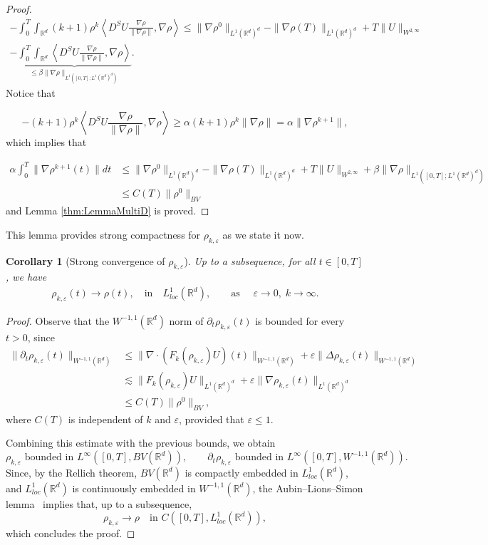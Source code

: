 \documentclass[11pt,twoside]{article}
\numberwithin{equation}{section}
\newcommand{\R}{\mathbb{R}}
\newcommand {\eps}  {\varepsilon}
\newcommand {\p}   {\partial}
\newtheorem{corollary}[theorem]{Corollary}
\begin{document}
\begin{proof}
\[
\begin{aligned}
-\int_0^T\int_{\R^d}(k+1)\rho^k \left\langle D^S U \frac{\nabla \rho}{\|\nabla \rho\|}, \nabla \rho \right\rangle \le \|\nabla \rho^0\|_{L^1(\R^d)^d} -\|\nabla \rho(T)\|_{L^1(\R^d)^d} + T \|U\|_{W^{2,\infty}} \\
-\underbrace{\int_0^T\int_{\R^d}\left\langle D^S U \frac{\nabla \rho}{\|\nabla \rho\|},\nabla \rho \right\rangle}_{\le \beta \|\nabla \rho \|_{L^1([0,T];L^1(\R^d)^d)}}.
\end{aligned}
\]
Notice that

\[
-(k+1)\rho^k \left\langle D^S U \frac{\nabla \rho}{\|\nabla \rho\|}, \nabla \rho \right\rangle  \ge \alpha (k+1)\rho^k\|\nabla\rho\| = \alpha \|\nabla \rho^{k+1}\|,
\]
which implies that 

\[
\begin{aligned}
\alpha \int_0^T\|\nabla \rho^{k+1}(t)\|dt &\le \|\nabla \rho^0\|_{L^1(\R^d)^d} -\|\nabla \rho(T)\|_{L^1(\R^d)^d} + T \|U\|_{W^{2,\infty}} + \beta \|\nabla \rho \|_{L^1([0,T];L^1(\R^d)^d)}\\
&\le C(T)\|\rho^0\|_{BV}
\end{aligned}
\]
and Lemma \ref{thm:LemmaMultiD} is proved. 
\end{proof}


This lemma provides strong compactness for $\rho_{k,\eps}$ as we state it now.
\begin{corollary}[Strong convergence of $\rho_{k,\eps}$]
\label{thm:conv_rho}
Up to a subsequence, for all $t \in [0,T]$, we have
\begin{align*}
    \rho_{k,\eps}(t) \longrightarrow \rho(t),\quad \text{in} \quad L^1_{loc}(\R^d), \qquad \text{as } \quad
    \eps \to 0, \; k \to \infty.
\end{align*}
\end{corollary}

\begin{proof}
Observe that the $W^{-1,1}(\R^d)$ norm of $\p_t \rho_{k,\eps}(t)$ is bounded for every $t>0$, since
\[
\begin{aligned}
\|\p_t \rho_{k,\eps}(t)\|_{W^{-1,1}(\R^d)}
&\le \|\nabla \cdot (F_k(\rho_{k,\eps})U)(t)\|_{W^{-1,1}(\R^d)}
   + \eps \|\Delta \rho_{k,\eps}(t)\|_{W^{-1,1}(\R^d)} \\
&\lesssim \|F_k(\rho_{k,\eps})U\|_{L^1(\R^d)^d}
   + \eps \|\nabla \rho_{k,\eps}(t)\|_{L^1(\R^d)^d} \\
&\le C(T)\|\rho^0\|_{BV},
\end{aligned}
\]
where $C(T)$ is independent of $k$ and $\eps$, provided that $\eps \le 1$. 

Combining this estimate with the previous bounds, we obtain
\[
\rho_{k,\eps} \text{ bounded in } L^{\infty}([0,T],BV(\R^d)),
\qquad
\partial_t \rho_{k,\eps} \text{ bounded in } L^{\infty}([0,T],W^{-1,1}(\R^d)).
\]
Since, by the Rellich theorem, $BV(\R^d)$ is compactly embedded in $L^1_{loc}(\R^d)$, and $L^1_{loc}(\R^d)$ is continuously embedded in $W^{-1,1}(\R^d)$, the Aubin--Lions--Simon lemma~\cite{simon_compact_1986} implies that, up to a subsequence,
\[
\rho_{k,\eps} \to \rho \quad \text{in } C([0,T],L^1_{loc}(\R^d)),
\]
which concludes the proof.
\end{proof}
\end{document}
